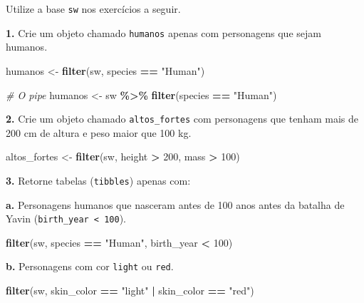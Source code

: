 \documentclass[
]{book}
\newenvironment{Shaded}{\begin{snugshade}}{\end{snugshade}}
\newcommand{\CommentTok}[1]{\textcolor[rgb]{0.56,0.35,0.01}{\textit{#1}}}
\newcommand{\DecValTok}[1]{\textcolor[rgb]{0.00,0.00,0.81}{#1}}
\newcommand{\FunctionTok}[1]{\textcolor[rgb]{0.13,0.29,0.53}{\textbf{#1}}}
\newcommand{\NormalTok}[1]{#1}
\newcommand{\OtherTok}[1]{\textcolor[rgb]{0.56,0.35,0.01}{#1}}
\newcommand{\SpecialCharTok}[1]{\textcolor[rgb]{0.81,0.36,0.00}{\textbf{#1}}}
\newcommand{\StringTok}[1]{\textcolor[rgb]{0.31,0.60,0.02}{#1}}
\begin{document}
Utilize a base \texttt{sw} nos exercícios a seguir.

\textbf{1.} Crie um objeto chamado \texttt{humanos} apenas com personagens que sejam
humanos.

\begin{Shaded}
\begin{Highlighting}[]
\NormalTok{humanos }\OtherTok{\textless{}{-}} \FunctionTok{filter}\NormalTok{(sw, species }\SpecialCharTok{==} \StringTok{"Human"}\NormalTok{)}

\CommentTok{\# O pipe}
\NormalTok{humanos }\OtherTok{\textless{}{-}}\NormalTok{ sw }\SpecialCharTok{\%\textgreater{}\%} 
  \FunctionTok{filter}\NormalTok{(species }\SpecialCharTok{==} \StringTok{"Human"}\NormalTok{)}
\end{Highlighting}
\end{Shaded}

\textbf{2.} Crie um objeto chamado \texttt{altos\_fortes} com personagens que tenham
mais de 200 cm de altura e peso maior que 100 kg.

\begin{Shaded}
\begin{Highlighting}[]
\NormalTok{altos\_fortes }\OtherTok{\textless{}{-}} \FunctionTok{filter}\NormalTok{(sw, height }\SpecialCharTok{\textgreater{}} \DecValTok{200}\NormalTok{, mass }\SpecialCharTok{\textgreater{}} \DecValTok{100}\NormalTok{)}
\end{Highlighting}
\end{Shaded}

\textbf{3.} Retorne tabelas (\texttt{tibbles}) apenas com:

\textbf{a.} Personagens humanos que nasceram antes de 100 anos antes da
batalha de Yavin (\texttt{birth\_year\ \textless{}\ 100}).

\begin{Shaded}
\begin{Highlighting}[]
\FunctionTok{filter}\NormalTok{(sw, species }\SpecialCharTok{==} \StringTok{"Human"}\NormalTok{, birth\_year }\SpecialCharTok{\textless{}} \DecValTok{100}\NormalTok{)}
\end{Highlighting}
\end{Shaded}

\textbf{b.} Personagens com cor \texttt{light} ou \texttt{red}.

\begin{Shaded}
\begin{Highlighting}[]
\FunctionTok{filter}\NormalTok{(sw, skin\_color }\SpecialCharTok{==} \StringTok{"light"} \SpecialCharTok{|}\NormalTok{ skin\_color }\SpecialCharTok{==} \StringTok{"red"}\NormalTok{)}
\end{Highlighting}
\end{Shaded}
\end{document}
